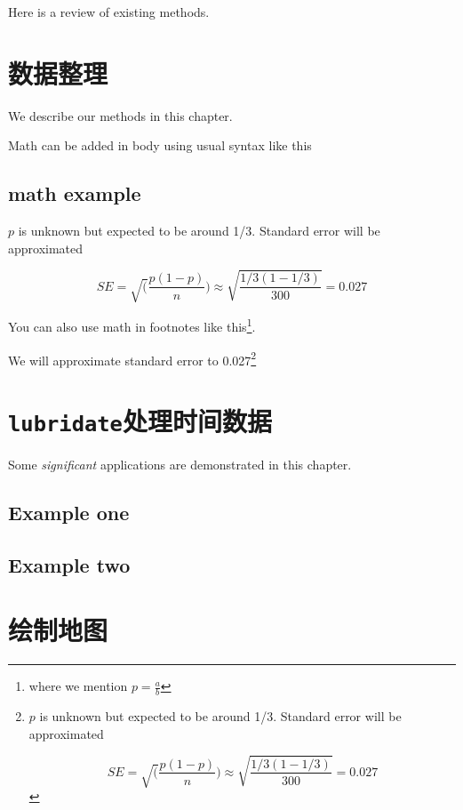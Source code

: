 \documentclass[
]{book}
\begin{document}
Here is a review of existing methods.

\hypertarget{ux6570ux636eux6574ux7406}{%
\chapter{数据整理}\label{ux6570ux636eux6574ux7406}}

We describe our methods in this chapter.

Math can be added in body using usual syntax like this

\hypertarget{math-example}{%
\section{math example}\label{math-example}}

\(p\) is unknown but expected to be around 1/3. Standard error will be approximated

\[
SE = \sqrt(\frac{p(1-p)}{n}) \approx \sqrt{\frac{1/3 (1 - 1/3)} {300}} = 0.027
\]

You can also use math in footnotes like this\footnote{where we mention \(p = \frac{a}{b}\)}.

We will approximate standard error to 0.027\footnote{\(p\) is unknown but expected to be around 1/3. Standard error will be approximated

  \[
  SE = \sqrt(\frac{p(1-p)}{n}) \approx \sqrt{\frac{1/3 (1 - 1/3)} {300}} = 0.027
  \]}

\hypertarget{lubridateux5904ux7406ux65f6ux95f4ux6570ux636e}{%
\chapter{\texorpdfstring{\texttt{lubridate}处理时间数据}{lubridate处理时间数据}}\label{lubridateux5904ux7406ux65f6ux95f4ux6570ux636e}}

Some \emph{significant} applications are demonstrated in this chapter.

\hypertarget{example-one}{%
\section{Example one}\label{example-one}}

\hypertarget{example-two}{%
\section{Example two}\label{example-two}}

\hypertarget{ux7ed8ux5236ux5730ux56fe}{%
\chapter{绘制地图}\label{ux7ed8ux5236ux5730ux56fe}}
\end{document}
